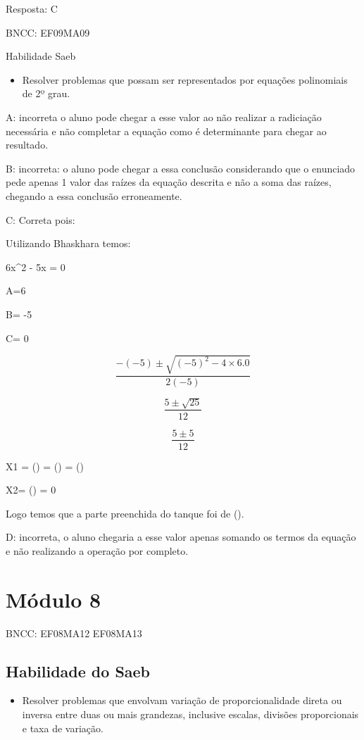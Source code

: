 Resposta: C

BNCC: EF09MA09

Habilidade Saeb

\begin{itemize}
\tightlist

\item 
  Resolver problemas que possam ser representados por equações
  polinomiais de 2º grau.
\end{itemize}

A: incorreta o aluno pode chegar a esse valor ao não realizar a
radiciação necessária e não completar a equação como é determinante para
chegar ao resultado.

B: incorreta: o aluno pode chegar a essa conclusão considerando que o
enunciado pede apenas 1 valor das raízes da equação descrita e não a
soma das raízes, chegando a essa conclusão erroneamente.

C: Correta pois:

Utilizando Bhaskhara temos:

6x^2 - 5x = 0

A=6

B= -5

C= 0

\[\frac{- ( - 5) \pm \sqrt{{( - 5)}^{2} - 4\times 6.0}}{2( - 5)}\]

\[\frac{5 \pm \sqrt{25}}{12}\]

\[\frac{5 \pm 5}{12}\]

X1 = () = () = ()

X2= () = 0

Logo temos que a parte preenchida do tanque foi de ().

D: incorreta, o aluno chegaria a esse valor apenas somando os termos da
equação e não realizando a operação por completo.

\chapter{Módulo 8}

BNCC: EF08MA12 EF08MA13

\section{Habilidade do Saeb}

\begin{itemize}
\tightlist

\item 
  Resolver problemas que envolvam variação de proporcionalidade direta
  ou inversa entre duas ou mais grandezas, inclusive escalas, divisões
  proporcionais e taxa de variação.
\end{itemize}

